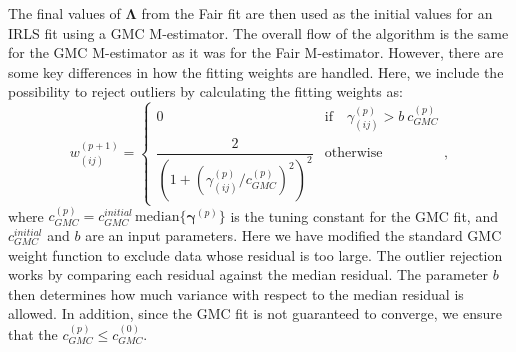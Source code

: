 The final values of $\bm{\Lambda}$ from the Fair fit are then used as the initial values for an IRLS fit using a GMC M-estimator.
The overall flow of the algorithm is the same for the GMC M-estimator as it was for the Fair M-estimator.
However, there are some key differences in how the fitting weights are handled.
Here, we include the possibility to reject outliers by calculating the fitting weights as:
\begin{equation}
  w_{(ij)}^{(p+1)} =
\begin{cases}
0 & \text{if} \quad \gamma_{(ij)}^{(p)} > b \ c_{GMC}^{(p)} \\
 \dfrac{2}{(1+(\gamma_{(ij)}^{(p)} / c_{GMC}^{(p)})^2)^2} & \text{otherwise}
\end{cases},
\end{equation}
where $c_{GMC}^{(p)} = c_{GMC}^{initial} \, \textrm{median}\{ \bm{\gamma}^{(p)} \}$ is the tuning constant for the GMC fit, and $c_{GMC}^{initial}$ and $b$ are an input parameters.
Here we have modified the standard GMC weight function to exclude data whose residual is too large.
The outlier rejection works by comparing each residual against the median residual.
The parameter $b$ then determines how much variance with respect to the median residual is allowed.
In addition, since the GMC fit is not guaranteed to converge, we ensure that the $c_{GMC}^{(p)} \leq c_{GMC}^{(0)}$.

